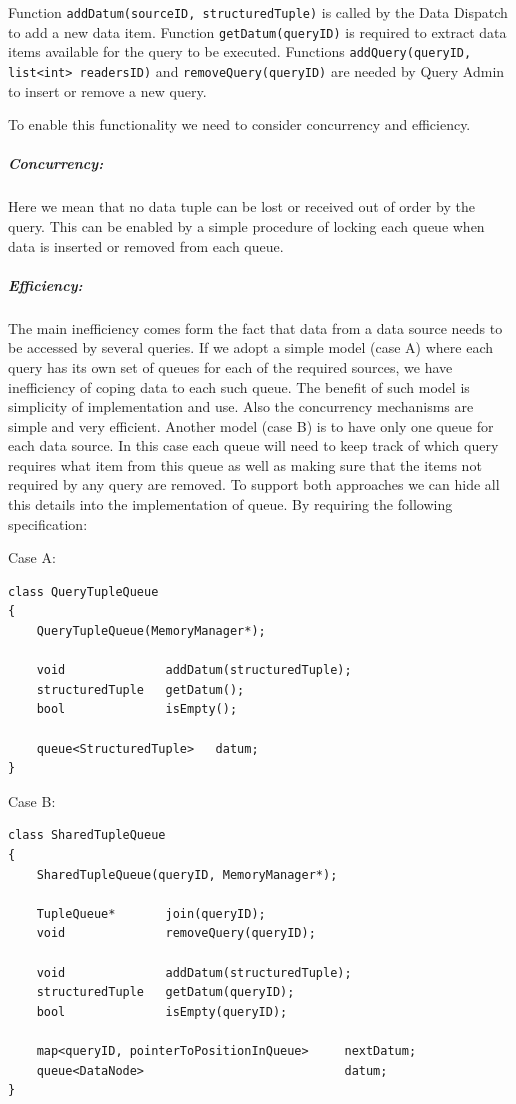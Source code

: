 \documentclass[11pt]{article}
\begin{document}
\noindent Function {\tt addDatum(sourceID, structuredTuple)} is called by the Data Dispatch to add a new data item. Function {\tt getDatum(queryID)} is required to extract data items available for the query to be executed. Functions {\tt addQuery(queryID, list<int> readersID)} and {\tt removeQuery(queryID)} are needed by Query Admin to insert or remove a new query. 

To enable this functionality we need to consider concurrency and efficiency. 

\subparagraph{Concurrency:} Here we mean that no data tuple can be lost or received out of order by the query. This can be enabled by a simple procedure of locking each queue when data is inserted or removed from each queue.

\subparagraph{Efficiency:} The main inefficiency comes form the fact that data from a data source needs to be accessed by several queries. If we adopt a simple model (case A) where each query has its own set of queues for each of the required sources, we have inefficiency of coping data to each such queue. The benefit of such model is simplicity of implementation and use. Also the concurrency mechanisms are simple and very efficient. Another model (case B) is to have only one queue for each data source. In this case each queue will need to keep track of which query requires what item from this queue as well as making sure that the items not required by any query are removed. To support both approaches we can hide all this details into the implementation of queue. By requiring the following specification:

\noindent Case A:
\begin{verbatim}
class QueryTupleQueue
{
    QueryTupleQueue(MemoryManager*);
	
	void              addDatum(structuredTuple);
	structuredTuple   getDatum();
	bool              isEmpty();

	queue<StructuredTuple>   datum;
}
\end{verbatim}

\noindent Case B:
\begin{verbatim}
class SharedTupleQueue
{
    SharedTupleQueue(queryID, MemoryManager*);

	TupleQueue*       join(queryID);
	void              removeQuery(queryID);
	
	void              addDatum(structuredTuple);
	structuredTuple   getDatum(queryID);
	bool              isEmpty(queryID);
	
	map<queryID, pointerToPositionInQueue>     nextDatum;
	queue<DataNode>                            datum;
}
\end{verbatim}
\end{document}
